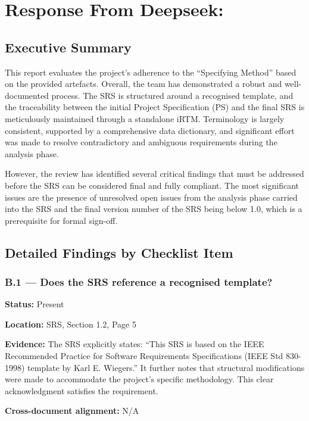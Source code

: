 \documentclass[11pt,a4paper]{article}
\begin{document}
\newpage

\section*{Response From Deepseek:}

\subsection*{Executive Summary}

This report evaluates the project's adherence to the ``Specifying Method'' based on the provided artefacts. Overall, the team has demonstrated a robust and well-documented process. The SRS is structured around a recognised template, and the traceability between the initial Project Specification (PS) and the final SRS is meticulously maintained through a standalone iRTM. Terminology is largely consistent, supported by a comprehensive data dictionary, and significant effort was made to resolve contradictory and ambiguous requirements during the analysis phase.

However, the review has identified several critical findings that must be addressed before the SRS can be considered final and fully compliant. The most significant issues are the presence of unresolved open issues from the analysis phase carried into the SRS and the final version number of the SRS being below 1.0, which is a prerequisite for formal sign-off.

\subsection*{Detailed Findings by Checklist Item}

\subsubsection*{B.1 --- Does the SRS reference a recognised template?}

\textbf{Status:} Present

\textbf{Location:} SRS, Section 1.2, Page 5

\textbf{Evidence:} The SRS explicitly states: ``This SRS is based on the IEEE Recommended Practice for Software Requirements Specifications (IEEE Std 830-1998) template by Karl E. Wiegers.'' It further notes that structural modifications were made to accommodate the project's specific methodology. This clear acknowledgment satisfies the requirement.

\textbf{Cross-document alignment:} N/A
\end{document}
